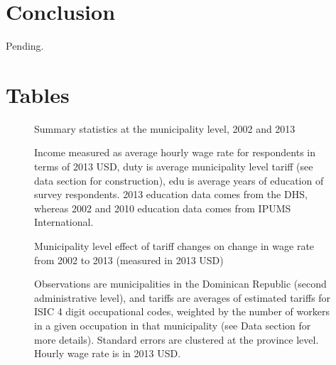 \documentclass[12pt]{article}
\begin{document}
\vspace{-10pt}
\section{Conclusion}
\label{sec:Conclusion}
Pending.

\newpage
\singlespacing



\newpage
\appendix
\singlespacing

\section{Tables}
\label{sec:Tables}
\fontsize{10pt}{12pt}\selectfont

\begin{figure}[H]
\begin{center}
Summary statistics at the municipality level, 2002 and 2013

\caption{\label{fig:Summary 1}}
\end{center}
Income measured
as average hourly wage rate for respondents in terms of 2013 USD, 
duty is average municipality level tariff (see data
section for construction), edu is average years of education of survey respondents. 
2013 education data comes from the DHS, whereas 2002 and 2010 education data comes
from IPUMS International.
\end{figure}

\begin{landscape}
\begin{figure}[H]
\begin{center}
Municipality level effect of tariff changes on change in wage rate from 2002 to 2013 (measured
in 2013 USD)

\caption{\label{fig:Table1}}
\end{center}
Observations are municipalities in the Dominican Republic (second administrative level),
and tariffs are averages of estimated tariffs for ISIC 4 %
digit occupational codes,
weighted by the number of workers in a given occupation in that municipality 
(see Data section for more details). Standard errors are clustered at the province level.
Hourly wage rate is in 2013 USD.
\end{figure}
\end{landscape}
\end{document}
